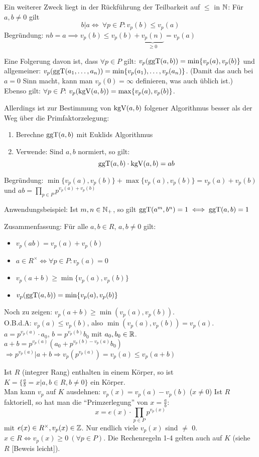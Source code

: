 \documentclass[a4paper,twoside,DIV15,BCOR12mm]{scrbook}
\begin{document}
Ein weiterer Zweck liegt in der Rückführung der Teilbarkeit auf
$\le$ in $\mathbb{N}$: Für $a,b\ne 0$ gilt \[b|a \iff \ \forall p\in P:
v_p(b) \le v_p(a) \] Begründung: $nb=a \implies v_p(b) \le v_p(b) + \underbrace{v_p(n)}_{\ge 0} = v_p(a)$

Eine Folgerung davon ist, dass $\forall p\in P$ gilt:
$v_p(\mathop{\rm ggT}\nolimits(a,b)) = \min\{v_p(a), v_p(b)\}$ und allgemeiner:
$v_p(\mathop{\rm ggT}\nolimits(a_1,\ldots,a_n)) = \min\{v_p(a_1),\ldots,v_p(a_n)\}$.
(Damit das auch bei $a = 0$ Sinn macht, kann man $v_p(0) = \infty$
definieren, was auch üblich ist.) Ebenso gilt: $\forall p\in P$:
$v_p(\mathop{\rm kgV}\nolimits(a,b)) = \max\{v_p(a), v_p(b)\}$.

Allerdings ist zur Bestimmung von $\mathop{\rm kgV}\nolimits(a,b)$ folgener Algorithmus
besser als der Weg über die Primfaktorzelegung:
\begin{enumerate}
\item Berechne $\mathop{\rm ggT}\nolimits(a,b)$ mit Euklids Algorithmus
\item Verwende: Sind $a,b$ normiert, so gilt:
\[ \mathop{\rm ggT}\nolimits(a,b) \cdot \mathop{\rm kgV}\nolimits(a,b) = ab \]
\end{enumerate}
Begründung: $\min\{v_p(a), v_p(b)\} + \max\{v_p(a), v_p(b)\} =
v_p(a) + v_p(b)$ und $ab = \prod_{p\in P} p^{v_p(a) + v_p(b)}$

Anwendungsbeispiel: Ist $m,n\in\mathbb{N}_+$, so gilt $\mathop{\rm ggT}\nolimits(a^m,b^n)=1
\iff \mathop{\rm ggT}\nolimits(a,b)=1$

Zusammenfassung: Für alle $a,b\in R$, $a,b\ne 0$ gilt:
\begin{itemize}
\item $v_p(ab) = v_p(a) + v_p(b)$
\item $a\in R^\times \iff \forall p\in P: v_p(a) = 0$
\item $v_p(a+b) \ge \min\{v_p(a),v_p(b)\}$
\item $v_p(\mathop{\rm ggT}\nolimits(a,b)) = \min\{v_p(a),v_p(b)\}$
\end{itemize}

Noch zu zeigen: $v_p(a+b) \ge \min(v_p(a),v_p(b))$.\\
O.B.d.A: $v_p(a) \le v_p(b)$, also $\min(v_p(a),v_p(b)) = v_p(a)$.
$a = p^{v_p(a)} \cdot a_0$, $b = p^{v_p(b)}b_0$ mit $a_0, b_0 \in \mathbb{R}$.\\
$a+b = p^{v_p(a)}(a_0 + p^{v_p(b)-v_p(a)}b_0)$ $\Rightarrow
p^{v_p(a)} | a+b \Rightarrow v_p(p^{v_p(a)}) = v_p(a) \le v_p(a+b)$

\begin{bemerkung}
Ist $R$ (integrer Rang) enthalten in einem Körper, so ist $K = \{\frac{a}{b} = x | a, b \in R, b \not=0\}$ ein Körper.\\
Man kann $v_p$ auf $K$ ausdehnen: $v_p(x) = v_p(a) - v_p(b)$ ($x \ne
0$) Ist $R$ faktoriell, so hat man die "`Primzerlegung"' von $x =
\frac{a}{b}:$
\[ x = e(x) \cdot \prod_{p \in P} p^{v_p(x)} \]
mit $e(x) \in R^\times, v_p(x) \in \mathbb{Z}$. Nur endlich viele $v_p(x)$
sind $\not=$ 0.\\$x \in R \Leftrightarrow v_p(x) \ge 0\ (\forall p
\in P)$. Die Rechenregeln 1-4 gelten auch auf $K$ (siehe $R$ [Beweis
leicht]).
\end{bemerkung}
\end{document}
